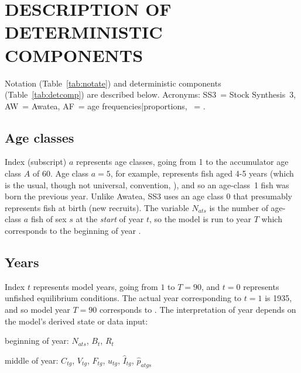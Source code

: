\documentclass[11pt]{book}
\begin{document}

\section{DESCRIPTION OF DETERMINISTIC COMPONENTS}

Notation (Table~\ref{tab:notate}) and deterministic components (Table~\ref{tab:detcomp}) are described below. Acronyms: SS3~= Stock Synthesis~3, AW~= Awatea, AF~= age frequencies|proportions, \spc~= \spn.


\subsection{Age classes}

Index (subscript) $a$ represents age classes, going from 1 to the accumulator age class $A$ of 60. 
Age class $a=5$, for example, represents fish aged 4-5 years (which is the usual, though not universal, convention, \citealt{Caswell:2001}), and so an age-class~1 fish was born the previous year.
Unlike Awatea, SS3 uses an age class 0 that presumably represents fish at birth (new recruits).
The variable $N_{ats}$ is the number of age-class $a$ fish of sex $s$ at the \textit{start} of year $t$, so the model is run to year $T$ which corresponds to the beginning of year \finalYr.

\subsection{Years}

Index $t$ represents model years, going from $1$ to $T=90$, and $t=0$ represents unfished equilibrium conditions. 
The actual year corresponding to $t=1$ is 1935, and so model year $T=90$ corresponds to \finalYr.
The interpretation of year depends on the model's derived state or data input:
\begin{itemize_csas}{}{}
\item beginning of year: $N_{ats}$, $B_t$, $R_t$
\item middle of year: $C_{tg}$, $V_{tg}$, $F_{tg}$, $u_{tg}$, $\widehat{I}_{tg}$, $\widehat{p}_{atgs}$
\end{itemize_csas}
\end{document}
